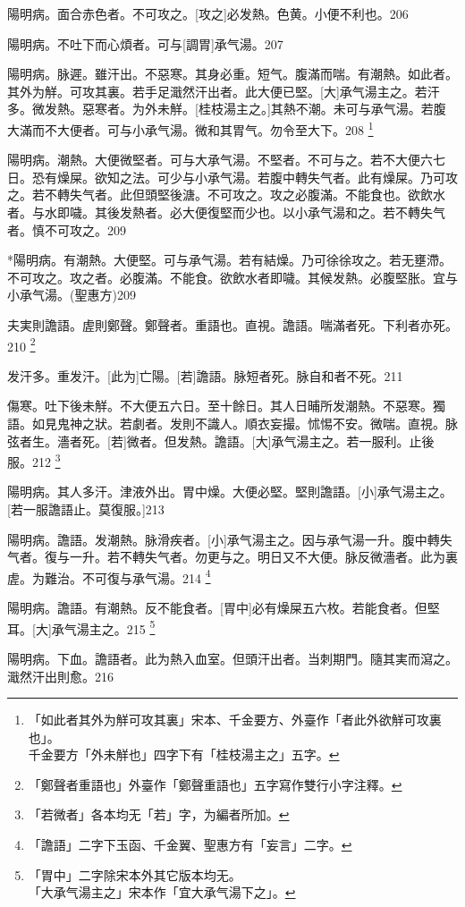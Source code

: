 \documentclass[12pt,twoside,UTF8,b5paper]{ctexbook}
\begin{document}
陽明病。面合赤色者。不可攻之。[攻之]必发熱。色黄。小便不利也。206

陽明病。不吐下而心煩者。可与[調胃]承气湯。207

陽明病。脉遲。雖汗出。不惡寒。其身必重。短气。腹滿而喘。有潮熱。如此者。其外为觧。可攻其裏。若手足濈然汗出者。此大便已堅。[大]承气湯主之。若汗多。微发熱。惡寒者。为外未觧。[桂枝湯主之。]其熱不潮。未可与承气湯。若腹大滿而不大便者。可与小承气湯。微和其胃气。勿令至大下。208
	\footnote{「如此者其外为觧可攻其裏」宋本、千金要方、外臺作「者此外欲觧可攻裏也」。\\千金要方「外未觧也」四字下有「桂枝湯主之」五字。}

陽明病。潮熱。大便微堅者。可与大承气湯。不堅者。不可与之。若不大便六七日。恐有燥屎。欲知之法。可少与小承气湯。若腹中轉失气者。此有燥屎。乃可攻之。若不轉失气者。此但頭堅後溏。不可攻之。攻之必腹滿。不能食也。欲飲水者。与水即噦。其後发熱者。必大便復堅而少也。以小承气湯和之。若不轉失气者。慎不可攻之。209

*陽明病。有潮熱。大便堅。可与承气湯。若有結燥。乃可徐徐攻之。若无壅滯。不可攻之。攻之者。必腹滿。不能食。欲飲水者即噦。其候发熱。必腹堅胀。宜与小承气湯。(聖惠方)209

夫実則譫語。虗則鄭聲。鄭聲者。重語也。直視。譫語。喘滿者死。下利者亦死。210
	\footnote{「鄭聲者重語也」外臺作「鄭聲重語也」五字寫作雙行小字注釋。}

发汗多。重发汗。[此为]亡陽。[若]譫語。脉短者死。脉自和者不死。211

傷寒。吐下後未觧。不大便五六日。至十餘日。其人日晡所发潮熱。不惡寒。獨語。如見鬼神之狀。若劇者。发則不識人。順衣妄撮。怵惕不安。微喘。直視。脉弦者生。濇者死。[若]微者。但发熱。譫語。[大]承气湯主之。若一服利。止後服。212
	\footnote{「若微者」各本均无「若」字，为編者所加。}

陽明病。其人多汗。津液外出。胃中燥。大便必堅。堅則譫語。[小]承气湯主之。[若一服譫語止。莫復服。]213

陽明病。譫語。发潮熱。脉滑疾者。[小]承气湯主之。因与承气湯一升。腹中轉失气者。復与一升。若不轉失气者。勿更与之。明日又不大便。脉反微濇者。此为裏虗。为難治。不可復与承气湯。214
	\footnote{「譫語」二字下玉函、千金翼、聖惠方有「妄言」二字。}

陽明病。譫語。有潮熱。反不能食者。[胃中]必有燥屎五六枚。若能食者。但堅耳。[大]承气湯主之。215
	\footnote{「胃中」二字除宋本外其它版本均无。\\「大承气湯主之」宋本作「宜大承气湯下之」。}

陽明病。下血。譫語者。此为熱入血室。但頭汗出者。当刺期門。隨其実而瀉之。濈然汗出則愈。216
\end{document}
